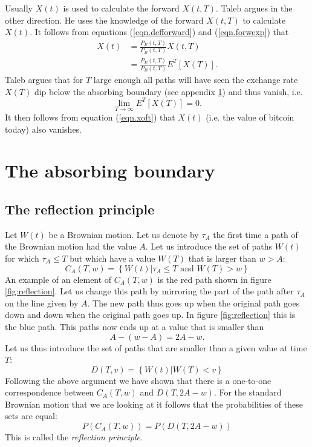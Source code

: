 \documentclass[12pt, oneside]{article}
\begin{document}
Usually $X(t)$ is used to calculate the forward $X(t,T)$. Taleb argues in the other direction. He uses the knowledge of the forward $X(t,T)$ to calculate $X(t)$. It follows from equations (\ref{eqn.defforward}) and (\ref{eqn.forwexp}) that
\begin{align}
	X(t) & = \frac{P_E(t,T)}{P_B(t,T)} X(t,T) \\
	& = \frac{P_E(t,T)}{P_B(t,T)} E^T[ X(T) ].\label{eqn.xoft}
\end{align}
Taleb argues that for $T$ large enough all paths will have seen the exchange rate $X(T)$ dip below the absorbing boundary (see appendix \ref{app.boundary}) and thus vanish, i.e.
\begin{equation}
	\lim_{T\rightarrow \infty} E^T[ X(T) ] = 0.
\end{equation}
It then follows from equation (\ref{eqn.xoft}) that $X(t)$ (i.e. the value of bitcoin today) also vanishes.



\appendix


\section{The absorbing boundary}\label{app.boundary}
\subsection{The reflection principle}\label{sec:brownianmotion}
Let $W(t)$ be a Brownian motion. Let us denote by $\tau_A$ the first time a path of the Brownian motion had the value $A$. Let us introduce the set of paths $W(t)$ for which $\tau_A\le T$ but which have a value $W(T)$ that is larger than $w>A$:
\begin{equation}
	C_A(T,w) = \left\{ W(t) \vert \tau_A\le T \text{ and } W(T)>w\right\}
\end{equation}
An example of an element of $C_A(T,w)$ is the red path shown in figure \ref{fig:reflection}. Let us change this path by mirroring the part of the path after $\tau_A$ on the line given by $A$. The new path thus goes up when the original path goes down and down when the original path goes up. In figure \ref{fig:reflection} this is the blue path. This paths now ends up at a value that is smaller than
\begin{equation}
	A - (w-A) = 2 A - w.
\end{equation}
Let us thus introduce the set of paths that are smaller than a given value at time $T$:
\begin{equation}
	D(T,v) = \left\{ W(t) \vert W(T)<v\right\}
\end{equation}
Following the above argument we have shown that there is a one-to-one correspondence between $C_A(T,w)$ and $D(T,2A-w)$. For the standard Brownian motion that we are looking at it follows that the probabilities of these sets are equal:
\begin{equation}
	P( C_A(T,w) ) = P( D(T,2A-w) )
\end{equation}
This is called the \emph{reflection principle}.
\end{document}
